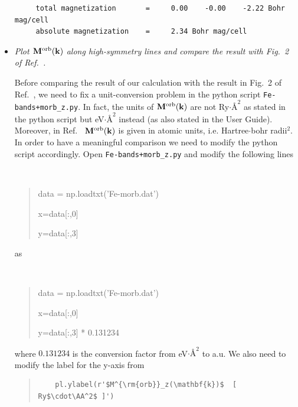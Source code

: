 \begin{itemize}
{\begin{tcolorbox}[title=From Fe.wpout,sharp corners,boxrule=0.5pt]
\begin{verbatim}
\end{verbatim}
\end{tcolorbox}
}

{\small
\begin{tcolorbox}[title=From scf.out,sharp corners,boxrule=0.5pt]
\begin{verbatim}
     total magnetization       =     0.00    -0.00    -2.22 Bohr mag/cell
     absolute magnetization    =     2.34 Bohr mag/cell
\end{verbatim}
\end{tcolorbox}

}

\item {\it Plot $\mathbf{M}^{\mathrm{orb}}(\bfk)$ along high-symmetry lines and compare the result with Fig.~2 of Ref.~.}

Before comparing the result of our calculation with the result in Fig.~2 of Ref.~,
we need to fix a unit-conversion problem in the python script {\tt Fe-bands+morb\_z.py}. In fact, the units of $\mathbf{M}^{\mathrm{orb}}(\bfk)$ are not Ry$\cdot\si{\angstrom}^2$ as stated in the python script but eV$\cdot\si{\angstrom}^2$ instead (as also stated in the User Guide). Moreover, in Ref.~ $\mathbf{M}^{\mathrm{orb}}(\bfk)$ is given in atomic units, i.e. Hartree$\cdot$bohr radii$^2$. In order to have a meaningful comparison we need to modify the python script accordingly. Open {\tt Fe-bands+morb\_z.py} and modify the following lines
{\tt
\begin{quote}
data = np.loadtxt('Fe-morb.dat')

x=data[:,0]

y=data[:,3]
\end{quote}
}

as

{\tt
\begin{quote}
data = np.loadtxt('Fe-morb.dat')

x=data[:,0]

y=data[:,3] * 0.131234
\end{quote}
}
where $0.131234$ is the conversion factor from eV$\cdot\si{\angstrom}^2$ to a.u. We also need to modify the label for the y-axis from

\begin{quote}
\begin{verbatim}
	pl.ylabel(r'$M^{\rm{orb}}_z(\mathbf{k})$  [ Ry$\cdot\AA^2$ ]')
\end{verbatim}
\end{quote}


\end{itemize}
